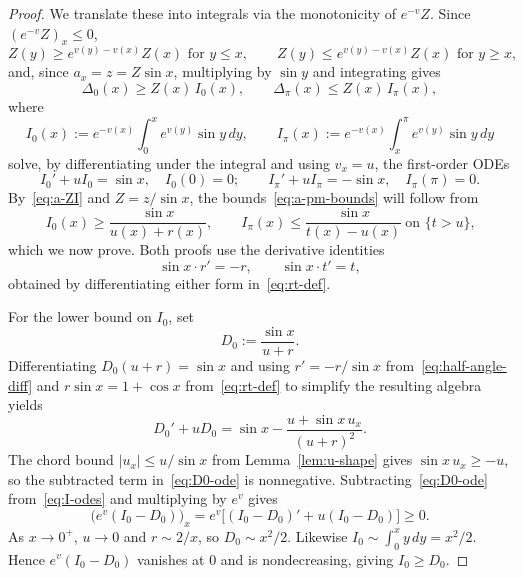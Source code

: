 \documentclass[10pt,a4paper]{amsart}
\begin{document}
\begin{proof}
We translate these into integrals via the monotonicity of $e^{-v}Z$.
Since $(e^{-v}Z)_x\leq 0$,
\[
Z(y)\geq e^{v(y)-v(x)}Z(x)\text{ for }y\leq x,\qquad
Z(y)\leq e^{v(y)-v(x)}Z(x)\text{ for }y\geq x,
\]
and, since $a_x=z=Z\sin x$, multiplying by $\sin y$ and integrating gives
\begin{equation}\label{eq:a-ZI}
\Delta_0(x)\geq Z(x)\,I_0(x),\qquad \Delta_\pi(x)\leq Z(x)\,I_\pi(x),
\end{equation}
where
\[
I_0(x):=e^{-v(x)}\int_0^x e^{v(y)}\sin y\,dy,\qquad
I_\pi(x):=e^{-v(x)}\int_x^\pi e^{v(y)}\sin y\,dy
\]
solve, by differentiating under the integral and using $v_x=u$, the
first-order ODEs
\begin{equation}\label{eq:I-odes}
I_0'+uI_0=\sin x,\quad I_0(0)=0;\qquad
I_\pi'+uI_\pi=-\sin x,\quad I_\pi(\pi)=0.
\end{equation}
By~\eqref{eq:a-ZI} and $Z=z/\sin x$, the bounds~\eqref{eq:a-pm-bounds} will follow from
\begin{equation}\label{eq:I-bounds}
I_0(x)\geq\frac{\sin x}{u(x)+r(x)},\qquad
I_\pi(x)\leq\frac{\sin x}{t(x)-u(x)}\ \text{on $\{t>u\}$,}
\end{equation}
which we now prove. Both proofs use the derivative identities
\begin{equation}\label{eq:half-angle-diff}
\sin x\cdot r'=-r,\qquad \sin x\cdot t'=t,
\end{equation}
obtained by differentiating either form in~\eqref{eq:rt-def}.

For the lower bound on $I_0$, set
\[
D_0:=\frac{\sin x}{u+r}.
\]
Differentiating
$D_0(u+r)=\sin x$ and using $r'=-r/\sin x$
from~\eqref{eq:half-angle-diff} and $r\sin x=1+\cos x$
from~\eqref{eq:rt-def} to simplify the resulting algebra yields
\begin{equation}\label{eq:D0-ode}
D_0'+uD_0=\sin x-\frac{u+\sin x\,u_x}{(u+r)^2}.
\end{equation}
The chord bound $|u_x|\leq u/\sin x$ from Lemma~\ref{lem:u-shape} gives
$\sin x\,u_x\geq -u$, so the subtracted term in~\eqref{eq:D0-ode} is
nonnegative. Subtracting~\eqref{eq:D0-ode} from~\eqref{eq:I-odes} and
multiplying by $e^v$ gives
\[
\bigl(e^v(I_0-D_0)\bigr)_x=e^v\bigl[(I_0-D_0)'+u(I_0-D_0)\bigr]\geq 0.
\]
As $x\to 0^+$, $u\to 0$ and $r\sim 2/x$, so $D_0\sim x^2/2$. Likewise
$I_0\sim\int_0^x y\,dy=x^2/2$. Hence $e^v(I_0-D_0)$ vanishes at $0$ and
is nondecreasing, giving $I_0\geq D_0$.


\end{proof}
\end{document}
